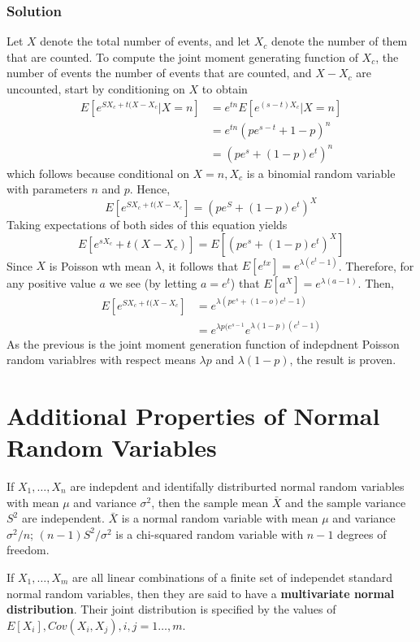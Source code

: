 \subsubsection*{Solution}
Let $X$ denote the total number of events, and let $X_c$ denote the number of them that are counted. To compute the joint moment generating function of $X_c$, the number of events the number of events that are counted, and $X - X_c$ are uncounted, start by conditioning on $X$ to obtain
\begin{equation*}
    \begin{split}
        E[e^{SX_c + t(X - X_c}| X = n] &= e^{tn}E[e^{(s-t)X_c}|X = n]\\
        &= e^{tn}(pe^{s-t} + 1 - p)^n\\
        &= (pe^s + (1 - p)e^t)^n
    \end{split}
\end{equation*}
which follows because conditional on $X = n, X_c$ is a binomial random variable with parameters $n$ and $p$. Hence, \[ E[e^{SX_c + t(X - X_c}] = (pe^S + (1-p)e^t)^X\]
Taking expectations of both sides of this equation yields \[E[e^{sX_c} + t(X - X_c)] = E[(pe^s + (1-p)e^t)^X]\]
Since $X$ is Poisson wth mean $\lambda$, it follows that $E[e^{tx}] = e^{\lambda (e^t-1)}$. Therefore, for any positive value $a$ we see (by letting $a = e^t$) that $E[a^X] = e^{\lambda (a-1)}$. Then, 
\begin{equation*}
    \begin{split}
        E[e^{SX_c + t(X - X_c}] &= e^{\lambda (pe^s + (1-o)e^t - 1)}\\
        &= e^{\lambda p(e^{s-1}}e^{\lambda(1-p)(e^t - 1)}
    \end{split}
\end{equation*}
As the previous is the joint moment generation function of indepdnent Poisson random variablres with respect means $\lambda p$ and $\lambda (1-p)$, the result is proven. 
\section{Additional Properties of Normal Random Variables}
If $X_1,\dots, X_n$ are indepdent and identifally distriburted normal random variables with mean $\mu$ and variance $\sigma^2$, then the sample mean $\bar{X}$ and the sample variance $S^2$ are independent. $\bar{X}$ is a normal random variable with mean $\mu$ and variance $\sigma^2/n$; $(n-1)S^2/\sigma^2$ is a chi-squared random variable with $n-1$ degrees of freedom. 
\begin{definition}
    If $X_1,\dots, X_m$ are all linear combinations of a finite set of independet standard normal random variables, then they are said to have a \textbf{multivariate normal distribution}. Their joint distribution is specified by the values of $E[X_i], Cov(X_i, X_j), i,j = 1\dots, m$.
\end{definition}